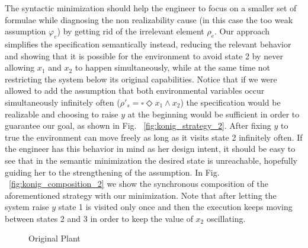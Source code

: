 The syntactic minimization should help the engineer to focus on a smaller set of formulae while diagnosing the non realizability cause (in this case the too weak assumption $\varphi_e$) by getting rid of the irrelevant element $\rho_e$. Our approach simplifies the specification semantically instead, reducing the relevant behavior and showing that it is possible for the environment to avoid state 2 by never allowing $x_1$ and $x_2$ to happen simultaneously, while at the same time not restricting the system below its original capabilities. Notice that if we were allowed to add the assumption that both environmental variables occur simultaneously infinitely often ($\rho'_s = \square \Diamond x_1 \wedge x_2$) the specification would be realizable and choosing to raise $y$ at the beginning would be sufficient in order to guarantee our goal, as shown in Fig. ~\ref{fig:konig_strategy_2}. After fixing $y$ to true the environment can move freely as long as it visits state 2 infinitely often. If the engineer has this behavior in mind as her design intent, it should be easy to see that in the semantic minimization the desired state is unreachable, hopefully guiding her to the strengthening of the assumption.  In Fig. ~\ref{fig:konig_composition_2} we show the synchronous composition of the aforementioned strategy with our minimization. Note that after letting the system raise $y$ state 1 is visited only once and then the execution keeps moving between states 2 and 3 in order to keep the value of $x_2$ oscillating.
\clearpage
\begin{figure}[bt]
	\centering
	\SmallPicture
	\caption{Original Plant}
\label{fig:konig_original_plant_2}
\MediumPicture
\end{figure}

